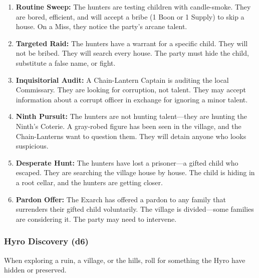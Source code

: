 \begin{enumerate}
\item \textbf{Routine Sweep:} The hunters are testing children with candle-smoke. They are bored, efficient, and will accept a bribe (1 Boon or 1 Supply) to skip a house. On a Miss, they notice the party's arcane talent.
\item \textbf{Targeted Raid:} The hunters have a warrant for a specific child. They will not be bribed. They will search every house. The party must hide the child, substitute a false name, or fight.
\item \textbf{Inquisitorial Audit:} A Chain-Lantern Captain is auditing the local Commissary. They are looking for corruption, not talent. They may accept information about a corrupt officer in exchange for ignoring a minor talent.
\item \textbf{Ninth Pursuit:} The hunters are not hunting talent---they are hunting the Ninth's Coterie. A gray-robed figure has been seen in the village, and the Chain-Lanterns want to question them. They will detain anyone who looks suspicious.
\item \textbf{Desperate Hunt:} The hunters have lost a prisoner---a gifted child who escaped. They are searching the village house by house. The child is hiding in a root cellar, and the hunters are getting closer.
\item \textbf{Pardon Offer:} The Exarch has offered a pardon to any family that surrenders their gifted child voluntarily. The village is divided---some families are considering it. The party may need to intervene.
\end{enumerate}

\subsubsection*{Hyro Discovery (d6)}
When exploring a ruin, a village, or the hills, roll for something the Hyro have hidden or preserved.

